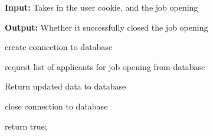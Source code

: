 \documentclass{article}
\begin{document}
\begin{algorithm}
\caption{The \textbf{closeJobOpening()} function}
\textbf{Input:} Takes in the user cookie, and the job opening

\textbf{Output:} Whether it successfully closed the job opening

create connection to database

request list of applicants for job opening from database

Return updated data to database

close connection to database

return true;

\end{algorithm}
\end{document}
